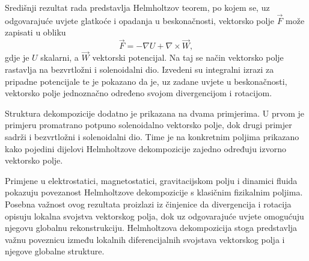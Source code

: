 \documentclass[12pt,a4paper]{article}
\begin{document}
Središnji rezultat rada predstavlja Helmholtzov teorem, po kojem se,
uz odgovarajuće uvjete glatkoće i opadanja u beskonačnosti, vektorsko polje
$\overrightarrow{F}$ može zapisati u obliku
\[
\overrightarrow{F}
=
-\nabla U
+
\nabla\times\overrightarrow{W},
\]
gdje je $U$ skalarni, a $\overrightarrow{W}$ vektorski potencijal. Na taj se
način vektorsko polje rastavlja na bezvrtložni i solenoidalni dio. Izvedeni su
integralni izrazi za pripadne potencijale te je pokazano da je, uz zadane
uvjete u beskonačnosti, vektorsko polje jednoznačno određeno svojom
divergencijom i rotacijom.

Struktura dekompozicije dodatno je prikazana na dvama primjerima. U prvom je
primjeru promatrano potpuno solenoidalno vektorsko polje, dok drugi primjer
sadrži i bezvrtložni i solenoidalni dio. Time je na konkretnim poljima
prikazano kako pojedini dijelovi Helmholtzove dekompozicije zajedno određuju
izvorno vektorsko polje.

Primjene u elektrostatici, magnetostatici, gravitacijskom polju i dinamici
fluida pokazuju povezanost Helmholtzove dekompozicije s klasičnim fizikalnim
poljima. Posebna važnost ovog rezultata proizlazi iz činjenice da divergencija
i rotacija opisuju lokalna svojstva vektorskog polja, dok uz odgovarajuće
uvjete omogućuju njegovu globalnu rekonstrukciju. Helmholtzova dekompozicija
stoga predstavlja važnu poveznicu između lokalnih diferencijalnih svojstava
vektorskog polja i njegove globalne strukture.
\end{document}
